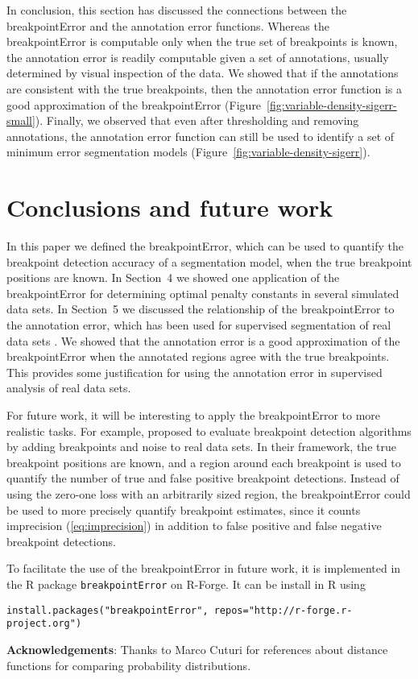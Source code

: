 \documentclass{jsfds} %
\begin{document}
In conclusion, this section has discussed the connections between the
breakpointError and the annotation error functions. Whereas the
breakpointError is computable only when the true set of breakpoints is
known, the annotation error is readily computable given a set of
annotations, usually determined by visual inspection of the data. We
showed that if the annotations are consistent with the true
breakpoints, then the annotation error function is a good
approximation of the breakpointError
(Figure~\ref{fig:variable-density-sigerr-small}). Finally, we observed
that even after thresholding and removing annotations, the annotation
error function can still be used to identify a set of minimum error
segmentation models
(Figure~\ref{fig:variable-density-sigerr}).


\section{Conclusions and future work}

In this paper we defined the breakpointError, which can be used to
quantify the breakpoint detection accuracy of a segmentation model,
when the true breakpoint positions are known. In Section~4 we showed
one application of the breakpointError for determining optimal penalty
constants in several simulated data sets. In Section~5 we discussed
the relationship of the breakpointError to the annotation error, which
has been used for supervised segmentation of real data sets
\citep{HOCKING-breakpoints, HOCKING-penalties, SegAnnDB}. We showed
that the annotation error is a good approximation of the
breakpointError when the annotated regions agree with the true
breakpoints. This provides some justification for using the annotation
error in supervised analysis of real data sets.

For future work, it will be interesting to apply the breakpointError
to more realistic tasks. For example, \citet{perf-eval-framework}
proposed to evaluate breakpoint detection algorithms by adding
breakpoints and noise to real data sets. In their framework, the true
breakpoint positions are known, and a region around each breakpoint is
used to quantify the number of true and false positive breakpoint
detections. Instead of using the zero-one loss with an arbitrarily
sized region, the breakpointError could be used to more precisely
quantify breakpoint estimates, since it counts imprecision
(\ref{eq:imprecision}) in addition to false positive and false
negative breakpoint detections.

To facilitate the use of the breakpointError in future work, it is
implemented in the R package \verb|breakpointError| on R-Forge. It can
be install in R using

\begin{verbatim}
install.packages("breakpointError", repos="http://r-forge.r-project.org")
\end{verbatim}

\textbf{Acknowledgements}: Thanks to Marco Cuturi for references about
distance functions for comparing probability distributions.

%

\end{document}
